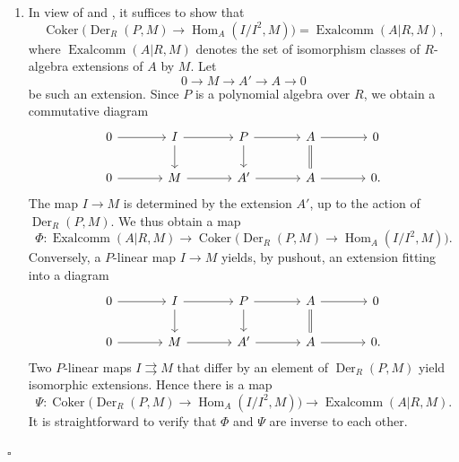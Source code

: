 \begin{enumerate}[label=(\arabic*)]
\item In view of  and , it suffices to show that
\[
 \operatorname{Coker}\bigl(
 \operatorname{Der}_R(P,M)\longrightarrow
 \operatorname{Hom}_A(I/I^2,M)\bigr)
 =\operatorname{Exalcomm}(A|R,M),
\]
where $\operatorname{Exalcomm}(A|R,M)$ denotes the set of
isomorphism classes of $R$-algebra extensions of $A$ by $M$.
Let
\[
 0\longrightarrow M\longrightarrow A'\longrightarrow A
 \longrightarrow0
\]
be such an extension. Since $P$ is a polynomial algebra over $R$,
we obtain a commutative diagram
\[
\begin{tikzcd}[column sep=large]
0 \arrow[r] & I \arrow[r] \arrow[d]
& P \arrow[r] \arrow[d]
& A \arrow[r] \arrow[d,equal] & 0 \\
0 \arrow[r] & M \arrow[r]
& A' \arrow[r]
& A \arrow[r] & 0.
\end{tikzcd}
\]
The map $I\longrightarrow M$ is determined by the extension $A'$,
up to the action of $\operatorname{Der}_R(P,M)$. We thus obtain a
map
\[
 \Phi:\operatorname{Exalcomm}(A|R,M)
 \longrightarrow
 \operatorname{Coker}\bigl(
 \operatorname{Der}_R(P,M)\longrightarrow
 \operatorname{Hom}_A(I/I^2,M)\bigr).
\]
Conversely, a $P$-linear map $I\longrightarrow M$ yields, by
pushout, an extension fitting into a diagram
\[
\begin{tikzcd}[column sep=large]
0 \arrow[r] & I \arrow[r] \arrow[d]
& P \arrow[r] \arrow[d]
& A \arrow[r] \arrow[d,equal] & 0 \\
0 \arrow[r] & M \arrow[r]
& A' \arrow[r]
& A \arrow[r] & 0.
\end{tikzcd}
\]
Two $P$-linear maps $I\rightrightarrows M$ that differ by an
element of $\operatorname{Der}_R(P,M)$ yield isomorphic
extensions. Hence there is a map
\[
 \Psi:\operatorname{Coker}\bigl(
 \operatorname{Der}_R(P,M)\longrightarrow
 \operatorname{Hom}_A(I/I^2,M)\bigr)
 \longrightarrow\operatorname{Exalcomm}(A|R,M).
\]
It is straightforward to verify that $\Phi$ and $\Psi$ are inverse
to each other.
\end{enumerate}
\hfill$\square$
